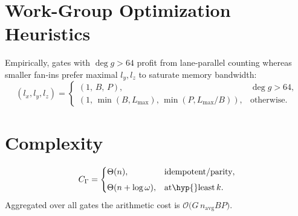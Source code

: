 \section{Work\hyp{}Group Optimization Heuristics}
\label{subsec:gate_opt}

Empirically, gates with $\deg g>64$ profit from lane\hyp{}parallel counting
whereas smaller fan\hyp{}ins prefer maximal $l_y,l_z$ to saturate memory
bandwidth:
\[
  (l_x,l_y,l_z)=
  \begin{cases}
    (1,\,B,\,P), & \deg g>64,\\[4pt]
    (1,\,\min(B,L_{\max}),\,\min(P,L_{\max}/B)), & \text{otherwise}.
  \end{cases}
\]

\section{Complexity}
\label{sec:gate_complexity}

\[
  C_{\Gamma}=\begin{cases}
    \Theta(n), & \text{idempotent/parity},\\[4pt]
    \Theta(n+\log\omega), & \text{at\hyp{}least\,$k$}.
  \end{cases}
\]
Aggregated over all gates the arithmetic cost is
$\mathcal{O}\bigl(G\,n_{\mathrm{avg}} B P\bigr)$.

